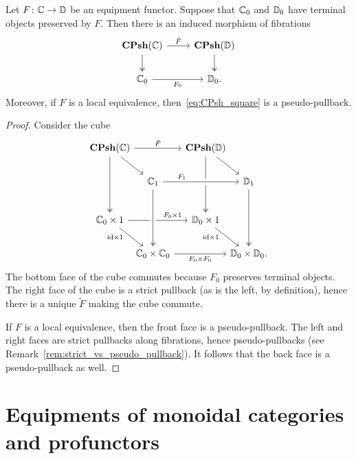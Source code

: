 \documentclass[11pt,oneside,article]{memoir}
\begin{document}
\begin{lemma}
      \label{lem:Psh_pullback}
   Let $F\colon\mathbb{C}\to\mathbb{D}$ be an equipment functor. Suppose that $\mathbb{C}_0$ and
   $\mathbb{D}_0$ have terminal objects preserved by $F$. Then there is an induced
   morphism of fibrations
   \begin{equation} \begin{tikzcd}
         \label{eq:CPsh_square}
      \CPsh(\dcat{C}) \ar[r,"\tilde{F}"] \ar[d,two heads] %
         & \CPsh(\dcat{D}) \ar[d,two heads] \\
      \dcat{C}_0 \ar[r,"F_0"']
         & \dcat{D}_0.
   \end{tikzcd} \end{equation}
   Moreover, if $F$ is a local equivalence, then~\eqref{eq:CPsh_square} is a pseudo-pullback.
\end{lemma}
\begin{proof}
   Consider the cube
   \[ \begin{tikzcd}[row sep={40,between origins}, column sep={55,between origins}]
      \CPsh(\dcat{C}) \ar[rr,"\tilde{F}"] \ar[dr] \ar[dd,two heads]
      &[-10] & \CPsh(\dcat{D}) \ar[dd,two heads] \ar[dr] &[-10] \\[-5]
      & \dcat{C}_1 \ar[rr,crossing over,"F_1" near start]
         && \dcat{D}_1 \ar[dd,two heads] \\
      \dcat{C}_0\times 1 \ar[rr,"F_0\times 1" pos=.75]
            \ar[dr,"\id\times 1"' {pos=.25,inner sep=2pt}]
         && \dcat{D}_0\times 1 \ar[dr,"\id\times 1"' {pos=.25,inner sep=2pt}] & \\[-5]
      & \dcat{C}_0\times\dcat{C}_0 \ar[rr,"F_0\times F_0"']
            \ar[from=uu,crossing over,two heads]
         && \dcat{D}_0\times\dcat{D}_0.
   \end{tikzcd} \]
   The bottom face of the cube commutes because $F_0$ preserves terminal objects. The right face of
   the cube is a strict pullback (as is the left, by definition), hence there is a unique $\tilde{F}$
   making the cube commute.

   If $F$ is a local equivalence, then the front face is a pseudo-pullback. The left and right faces
   are strict pullbacks along fibrations, hence pseudo-pullbacks (see Remark~\ref{rem:strict_vs_pseudo_pullback}).  It follows that the
   back face is a pseudo-pullback as well.
\end{proof}

\chapter{Equipments of monoidal categories and profunctors}
      \label{chap:equipments_monoidal_profunctors}
\end{document}
